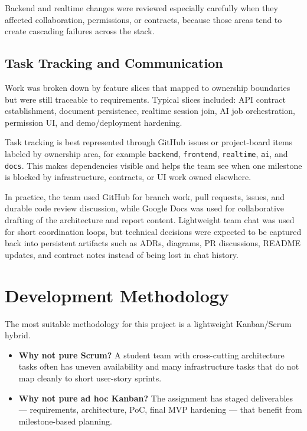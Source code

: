 Backend and realtime changes were reviewed especially carefully when they affected collaboration,
permissions, or contracts, because those areas tend to create cascading failures across the stack.

\subsection{Task Tracking and Communication}

Work was broken down by feature slices that mapped to ownership boundaries but were still traceable to
requirements. Typical slices included: API contract establishment, document persistence, realtime session
join, AI job orchestration, permission UI, and demo/deployment hardening.

Task tracking is best represented through GitHub issues or project-board items labeled by ownership area,
for example \texttt{backend}, \texttt{frontend}, \texttt{realtime}, \texttt{ai}, and \texttt{docs}. This makes
dependencies visible and helps the team see when one milestone is blocked by infrastructure, contracts,
or UI work owned elsewhere.

In practice, the team used GitHub for branch work, pull requests, issues, and durable code review
discussion, while Google Docs was used for collaborative drafting of the architecture and report content.
Lightweight team chat was used for short coordination loops, but technical decisions were expected to be
captured back into persistent artifacts such as ADRs, diagrams, PR discussions, README updates, and
contract notes instead of being lost in chat history.

\section{Development Methodology}

The most suitable methodology for this project is a lightweight Kanban/Scrum hybrid.

\begin{itemize}
  \item \textbf{Why not pure Scrum?} A student team with cross-cutting architecture tasks often has
  uneven availability and many infrastructure tasks that do not map cleanly to short user-story sprints.
  \item \textbf{Why not pure ad hoc Kanban?} The assignment has staged deliverables --- requirements,
  architecture, PoC, final MVP hardening --- that benefit from milestone-based planning.
\end{itemize}

